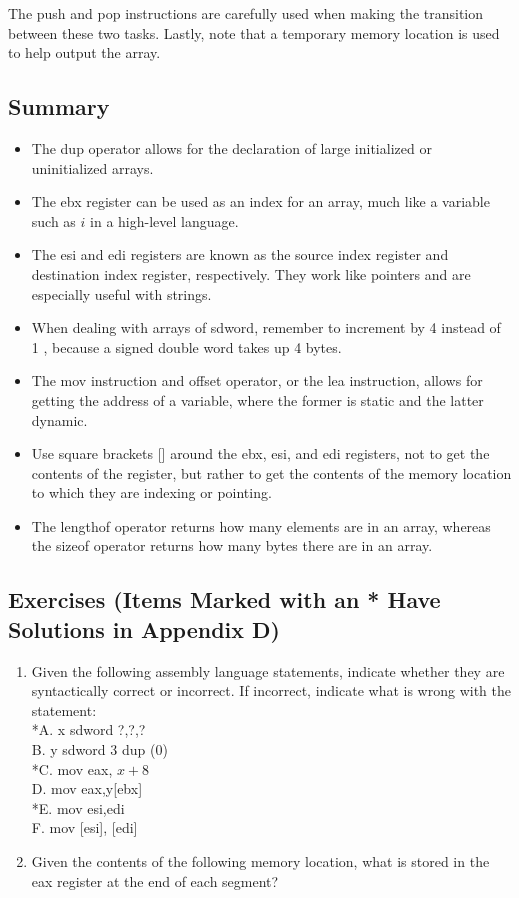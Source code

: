\documentclass[10pt]{book}
\begin{document}
The push and pop instructions are carefully used when making the transition between these two tasks. Lastly, note that a temporary memory location is used to help output the array.

\subsection{Summary}
\begin{itemize}
  \item The dup operator allows for the declaration of large initialized or uninitialized arrays.
  \item The ebx register can be used as an index for an array, much like a variable such as $i$ in a high-level language.
  \item The esi and edi registers are known as the source index register and destination index register, respectively. They work like pointers and are especially useful with strings.
  \item When dealing with arrays of sdword, remember to increment by 4 instead of 1 , because a signed double word takes up 4 bytes.
  \item The mov instruction and offset operator, or the lea instruction, allows for getting the address of a variable, where the former is static and the latter dynamic.
  \item Use square brackets [] around the ebx, esi, and edi registers, not to get the contents of the register, but rather to get the contents of the memory location to which they are indexing or pointing.
  \item The lengthof operator returns how many elements are in an array, whereas the sizeof operator returns how many bytes there are in an array.
\end{itemize}

\subsection{Exercises (Items Marked with an * Have Solutions in Appendix D)}
\begin{enumerate}
  \item Given the following assembly language statements, indicate whether they are syntactically correct or incorrect. If incorrect, indicate what is wrong with the statement:\\
*A. x sdword ?,?,?\\
B. y sdword 3 dup (0)\\
*C. mov eax, $x+8$\\[0pt]
D. mov eax,y[ebx]\\
*E. mov esi,edi\\[0pt]
F. mov [esi], [edi]
  \item Given the contents of the following memory location, what is stored in the eax register at the end of each segment?
\end{enumerate}
\end{document}
